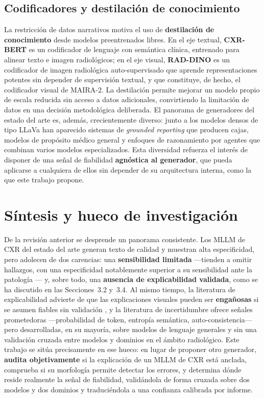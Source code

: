 \subsection{Codificadores y destilación de conocimiento}
La restricción de datos narrativos motiva el uso de \textbf{destilación de conocimiento} desde
modelos preentrenados libres. En el eje textual, \textbf{CXR-BERT} \parencite{boecking2022} es un
codificador de lenguaje con semántica clínica, entrenado para alinear texto e imagen radiológicos; en
el eje visual, \textbf{RAD-DINO} \parencite{perezgarcia2024} es un codificador de imagen radiológica
auto-supervisado que aprende representaciones potentes sin depender de supervisión textual, y que
constituye, de hecho, el codificador visual de MAIRA-2. La destilación permite mejorar un modelo
propio de escala reducida sin acceso a datos adicionales, convirtiendo la limitación de datos en una
decisión metodológica deliberada. El panorama de generadores del estado del arte es, además,
crecientemente diverso: junto a los modelos densos de tipo LLaVa han aparecido sistemas de
\textit{grounded reporting} que producen cajas, modelos de propósito médico general y enfoques de
razonamiento por agentes que combinan varios modelos especializados. Esta diversidad refuerza el
interés de disponer de una señal de fiabilidad \textbf{agnóstica al generador}, que pueda aplicarse a
cualquiera de ellos sin depender de su arquitectura interna, como la que este trabajo propone.

\section{Síntesis y hueco de investigación}
De la revisión anterior se desprende un panorama consistente. Los MLLM de CXR del estado del arte
generan texto de calidad y muestran alta especificidad, pero adolecen de dos carencias: una
\textbf{sensibilidad limitada} —tienden a omitir hallazgos, con una especificidad notablemente
superior a su sensibilidad ante la patología \parencite{frontiers2025}— y, sobre todo, una
\textbf{ausencia de explicabilidad validada}, como se ha discutido en las Secciones~3.2 y~3.4. Al
mismo tiempo, la literatura de explicabilidad
advierte de que las explicaciones visuales pueden ser \textbf{engañosas} si se asumen fiables sin
validación \parencite{ghassemi2021}, y la literatura de incertidumbre ofrece señales prometedoras
—probabilidad de token, entropía semántica, auto-consistencia— pero desarrolladas, en su mayoría,
sobre modelos de lenguaje generales y sin una validación cruzada entre modelos y dominios en el
ámbito radiológico. Este trabajo se sitúa precisamente en ese hueco: en lugar de proponer otro
generador, \textbf{audita objetivamente} si la explicación de un MLLM de CXR está anclada, comprueba
si su morfología permite detectar los errores, y determina dónde reside realmente la señal de
fiabilidad, validándola de forma cruzada sobre dos modelos y dos dominios y traduciéndola a una
confianza calibrada por informe.
